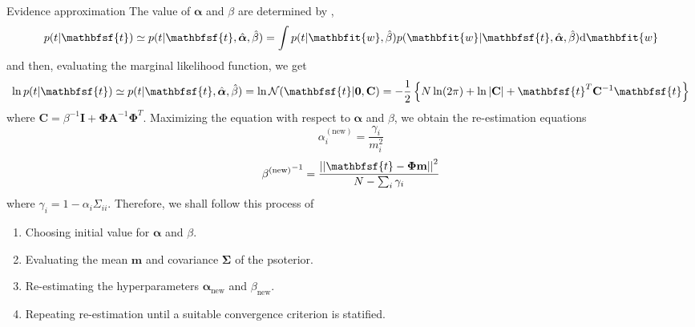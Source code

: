\documentclass{bredelebeamer}
\begin{document}
\begin{frame}{Evidence approximation}
   The value of $\boldsymbol{\alpha}$ and $\beta$ are determined by ,
   \begin{equation}
     p(t|\mathbfsf{t}) \simeq p(t|\mathbfsf{t},\hat{\boldsymbol{\alpha}},\hat{\beta})
     = \int p(t|\mathbfit{w}, \hat{\beta}) p(\mathbfit{w}|\mathbfsf{t},\hat{\boldsymbol{\alpha}},\hat{\beta}) \mathrm{d} \mathbfit{w}
   \end{equation}
   and then, evaluating the marginal likelihood function, we get
   \begin{equation}
     \ln p(t|\mathbfsf{t}) \simeq p(t|\mathbfsf{t},\hat{\boldsymbol{\alpha}},\hat{\beta})
     = \ln \mathcal{N} (\mathbfsf{t} | \mathbf{0}, \mathbf{C})
     = - \frac{1}{2}
     \left\{
     N \ln (2\pi) +
     \ln |\mathbf{C}| +
     \mathbfsf{t}^T \mathbf{C}^{-1} \mathbfsf{t}
     \right\}
   \end{equation}
   where $\mathbf{C} = \beta^{-1} \mathbf{I} + \boldsymbol{\Phi} \mathbf{A}^{-1} \boldsymbol{\Phi}^T$.
   Maximizing the equation with respect to $\boldsymbol{\alpha}$ and $\beta$, we
   obtain the re-estimation equations
   \begin{equation}
     \alpha_i^{(\textrm{new})} = \frac{\gamma_i}{m_i^2}
   \end{equation}
   \begin{equation}
     {\beta^{(\textrm{new})}}^{-1} = \frac{{||\mathbfsf{t} - \boldsymbol{\Phi}\mathbf{m}||}^2}{N - \sum_i \gamma_i}
   \end{equation}
   where $\gamma_i = 1 - \alpha_i \Sigma_{ii}$.
   Therefore, we shall follow this process of
   \begin{enumerate}
     \item Choosing initial value for $\boldsymbol{\alpha}$ and $\beta$.
     \item Evaluating the mean $\mathbf{m}$ and covariance $\boldsymbol{\Sigma}$ of the psoterior.
     \item Re-estimating the hyperparameters $\boldsymbol{\alpha}_{\textrm{new}}$ and $\beta_{\textrm{new}}$.
     \item Repeating re-estimation until a suitable convergence criterion is statified.
   \end{enumerate}
\end{frame}
\end{document}
